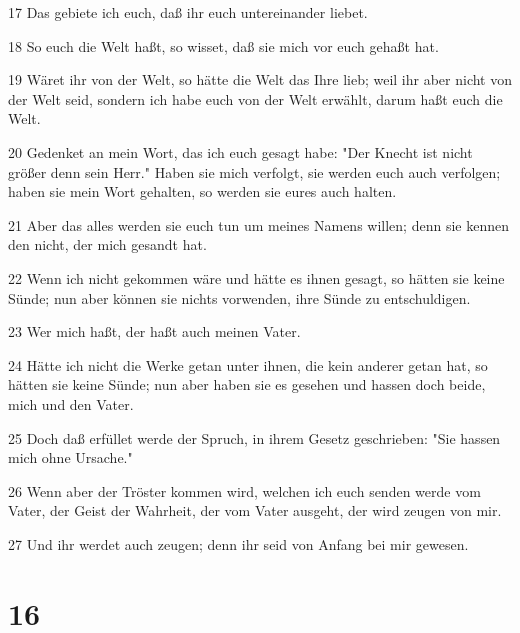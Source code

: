 \par 17 Das gebiete ich euch, daß ihr euch untereinander liebet.
\par 18 So euch die Welt haßt, so wisset, daß sie mich vor euch gehaßt hat.
\par 19 Wäret ihr von der Welt, so hätte die Welt das Ihre lieb; weil ihr aber nicht von der Welt seid, sondern ich habe euch von der Welt erwählt, darum haßt euch die Welt.
\par 20 Gedenket an mein Wort, das ich euch gesagt habe: "Der Knecht ist nicht größer denn sein Herr." Haben sie mich verfolgt, sie werden euch auch verfolgen; haben sie mein Wort gehalten, so werden sie eures auch halten.
\par 21 Aber das alles werden sie euch tun um meines Namens willen; denn sie kennen den nicht, der mich gesandt hat.
\par 22 Wenn ich nicht gekommen wäre und hätte es ihnen gesagt, so hätten sie keine Sünde; nun aber können sie nichts vorwenden, ihre Sünde zu entschuldigen.
\par 23 Wer mich haßt, der haßt auch meinen Vater.
\par 24 Hätte ich nicht die Werke getan unter ihnen, die kein anderer getan hat, so hätten sie keine Sünde; nun aber haben sie es gesehen und hassen doch beide, mich und den Vater.
\par 25 Doch daß erfüllet werde der Spruch, in ihrem Gesetz geschrieben: "Sie hassen mich ohne Ursache."
\par 26 Wenn aber der Tröster kommen wird, welchen ich euch senden werde vom Vater, der Geist der Wahrheit, der vom Vater ausgeht, der wird zeugen von mir.
\par 27 Und ihr werdet auch zeugen; denn ihr seid von Anfang bei mir gewesen.

\chapter{16}

